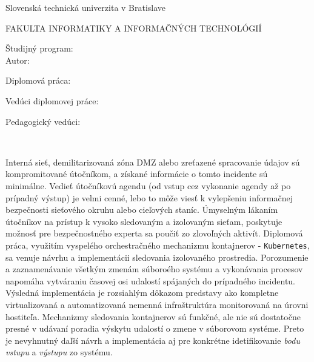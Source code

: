 \begin{minipage}[t]{1\columnwidth}%
Slovenská technická univerzita v Bratislave

FAKULTA INFORMATIKY A INFORMAČNÝCH TECHNOLÓGIÍ

Študijný program: \mojStudProgram\\

Autor: \mojeMeno

Diplomová práca: \mojNazov

Vedúci diplomovej práce: \mojVeduci

Pedagogický vedúci: \mojPedagogVeduci

\mojDatum\\
\end{minipage}


Interná sieť, demilitarizovaná zóna DMZ alebo zreťazené spracovanie údajov sú kompromitované útočníkom, a získané informácie o tomto incidente sú minimálne. Vedieť útočníkovú agendu (od vstup cez vykonanie agendy až po prípadný výstup) je velmi cenné, lebo to môže viesť k vylepšeniu informačnej bezpečnosti sieťového okruhu alebo cieľových staníc. Úmyselným lákaním útočníkov na prístup k vysoko sledovaným a izolovaným sieťam, poskytuje možnosť pre bezpečnostného experta sa poučiť zo zlovoľných aktivít. Diplomová práca, využitím vyspelého orchestračného mechanizmu kontajnerov - \texttt{Kubernetes}, sa venuje návrhu a implementácii sledovania izolovaného prostredia. Porozumenie a zaznamenávanie všetkým zmenám súboroého systému a vykonávania procesov napomáha vytváraniu časovej osi udalostí spájaných do prípadného incidentu. Výsledná implementácia je rozsiahlým dôkazom predstavy ako kompletne virtualizovaná a automatizovaná nemenná infraštruktúra monitorovaná na úrovni hostiteľa. Mechanizmy sledovania kontajnerov sú funkčné, ale nie sú dostatočne presné v udávaní poradia výskytu udalostí o zmene v súborovom systéme. Preto je nevyhnutný daľší návrh a implementácia aj pre konkrétne idetifikovanie \textit{bodu vstupu} a \textit{výstupu} zo systému.


\newpage{}\thispagestyle{empty}\medskip{}


\newpage{}

\newpage
\thispagestyle{empty}
\mbox{}
\newpage

\newpage
\thispagestyle{empty}
{}
{}
\newpage


\thispagestyle{empty}
\mbox{}
\newpage

